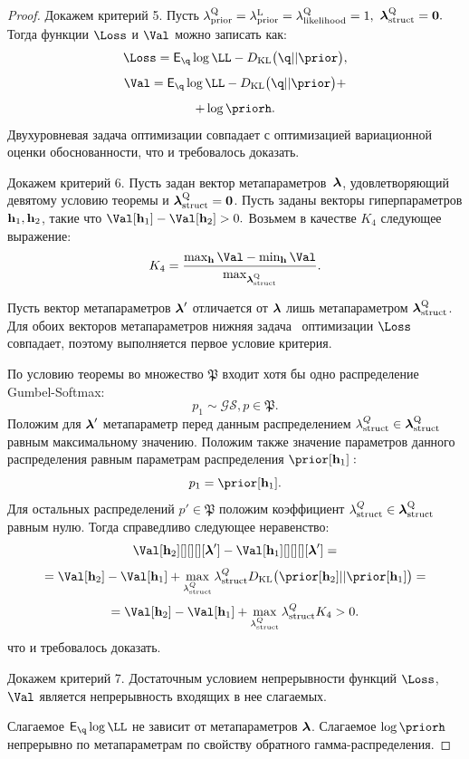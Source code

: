 \begin{proof}
Докажем критерий 5. Пусть $\lambda_\text{prior}^\text{Q} = \lambda_\text{prior}^\text{L} = \lambda_\text{likelihood}^\text{Q} = 1,$ $\boldsymbol{\lambda}_\text{struct}^\text{Q} = \mathbf{0}.$ Тогда функции $\Loss$ и $\Val$  можно записать как: 
$$\Loss = \E_{\q} \log \LL - \KL{\q}{\prior},$$
$$ \Val = \E_{\q} \log \LL - \KL{\q}{\prior}+$$
$$ + \log\priorh.$$
Двухуровневая задача оптимизации совпадает с оптимизацией вариационной оценки обоснованности, что и требовалось доказать.

Докажем критерий 6. 
Пусть задан вектор метапараметров~$\boldsymbol{\lambda}$, удовлетворяющий девятому условию теоремы и $\boldsymbol{\lambda}_\text{struct}^\text{Q} = \mathbf{0}$. Пусть заданы векторы гиперпараметров $\mathbf{h}_1, \mathbf{h}_2$, такие что $\Val[\h_1] - \Val[\h_2]>0.$
Возьмем в качестве $K_4$ следующее выражение:
\[
K_4 = \frac{\max_{\h} \Val - \min_{\h }\Val}{\max_{\lamS}}.
\]

Пусть вектор метапараметров $\boldsymbol{\lambda}'$ отличается от $\boldsymbol{\lambda}$ лишь метапараметром $\boldsymbol{\lambda}_\text{struct}^\text{Q}$. Для  обоих векторов метапараметров нижняя задача  оптимизации $\Loss$ совпадает, поэтому выполняется первое условие критерия.

По условию теоремы во множество $\mathfrak{P}$ входит хотя бы одно распределение Gumbel-Softmax:
\[
    p_1 \sim \mathcal{GS}, p \in \mathfrak{P}.
\]
Положим для $\boldsymbol{\lambda}'$ метапараметр перед данным распределением $\lambda^{Q}_\text{struct} \in \boldsymbol{\lambda}_\text{struct}^\text{Q}$ равным максимальному значению. Положим также значение параметров данного распределения равным параметрам распределения $\prior[\h_1]:$
\[
    p_1 = \prior[\h_1].
\]
Для остальных распределений $p' \in \mathfrak{P}$ положим коэффициент $\lambda^{Q}_\text{struct} \in \boldsymbol{\lambda}_\text{struct}^\text{Q}$ равным нулю.  
Тогда справедливо следующее неравенство:
\[
\Val[\h_2][][][][\lam'] - \Val[\h_1][][][][\lam'] = 
\]
\[
=\Val[\h_2]-\Val[\h_1] + \max_{\lambda^{Q}_\text{struct}}\lambda^{Q}_\text{struct} \KL{\prior[\h_2]}{\prior[\h_1]} =
\]
\[
   = \Val[\h_2]-\Val[\h_1] + \max_{\lambda^{Q}_\text{struct}}\lambda^{Q}_\text{struct} K_4 > 0.
\]
что и требовалось доказать.

Докажем критерий 7.
Достаточным условием непрерывности функций $\Loss$, $\Val$ является непрерывность входящих в нее слагаемых. 

Слагаемое $\E_{\q}\log\LL$ не зависит от метапараметров $\boldsymbol{\lambda}$. Слагаемое $\log\priorh$ непрерывно по метапараметрам по свойству обратного гамма-распределения.


\end{proof}
